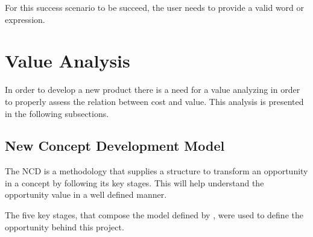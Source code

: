 For this success scenario to be succeed, the user needs to provide a valid word or expression.

\section{Value Analysis}

In order to develop a new product there is a need for a value analyzing in order to properly assess the relation between cost and value.
This analysis is presented in the following subsections.

\subsection{New Concept Development Model}

The \gls{NCD} \autocite{koen_2001} is a methodology that supplies a structure to transform an opportunity in a concept by following its key stages.
This will help understand the opportunity value in a well defined manner.

The five key stages, that compose the model defined by \textcite{koen_2001}, were used to define the opportunity behind this project.

